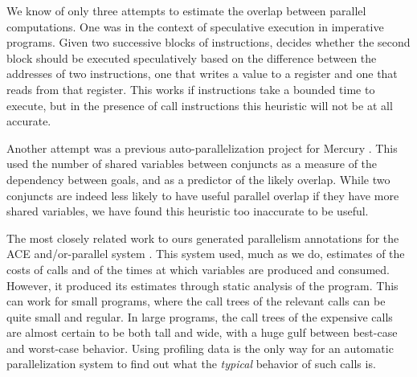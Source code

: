 We know of only three attempts to estimate the overlap
between parallel computations.
One was in the context of speculative execution in imperative programs.
Given two successive blocks of instructions,
\cite{von_Praun:2007:implicit_parallelism_with_ordered_transactions}
decides whether the second block should be executed speculatively
based on the difference between the addresses of two instructions,
one that writes a value to a register and one that reads from that register.
This works if instructions take a bounded time to execute,
but in the presence of call instructions
this heuristic will not be at all accurate.

Another attempt was a previous auto-parallelization project for
Mercury \cite{tannier:2007:parallel_mercury}.
This used the number of shared variables between conjuncts
as a measure of the dependency between goals,
and as a predictor of the likely overlap.
While two conjuncts are indeed less likely
to have useful parallel overlap if they have more shared variables,
we have found this heuristic too inaccurate to be useful.

The most closely related work to ours
generated parallelism annotations for the ACE and/or-parallel system
\cite{Pontelli97automaticcompile-time}.
This system used, much as we do,
estimates of the costs of calls
and of the times at which variables are produced and consumed.
However, it produced its estimates through static analysis of the program.
This can work for small programs,
where the call trees of the relevant calls can be quite small and regular.
In large programs, the call trees of the expensive calls
are almost certain to be both tall and wide,
with a huge gulf between best-case and worst-case behavior.
Using profiling data is the only way
for an automatic parallelization system to find out
what the \emph{typical} behavior of such calls is.


